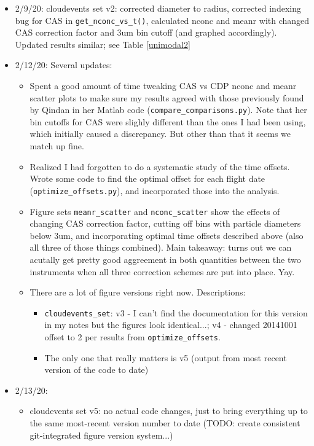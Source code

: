 \documentclass{article}
\begin{document}
\begin{itemize}
\begin{itemize}
		\end{itemize}
	\item 2/9/20: cloudevents set v2: corrected diameter to radius, corrected indexing bug for CAS in \texttt{get\_nconc\_vs\_t()}, calculated nconc and meanr with changed CAS correction factor and 3um bin cutoff (and graphed accordingly). Updated results similar; see Table \ref{unimodal2}\\
	\item 2/12/20: Several updates:
	\begin{itemize}
		\item Spent a good amount of time tweaking CAS vs CDP nconc and meanr scatter plots to make sure my results agreed with those previously found by Qindan in her Matlab code (\texttt{compare\_comparisons.py}). Note that her bin cutoffs for CAS were slighly different than the ones I had been using, which initially caused a discrepancy. But other than that it seems we match up fine.
		\item Realized I had forgotten to do a systematic study of the time offsets. Wrote some code to find the optimal offset for each flight date (\texttt{optimize\_offsets.py}), and incorporated those into the analysis. 
		\item Figure sets \texttt{meanr\_scatter} and \texttt{nconc\_scatter} show the effects of changing CAS correction factor, cutting off bins with particle diameters below 3um, and incorporating optimal time offsets described above (also all three of those things combined). Main takeaway: turns out we can acutally get pretty good aggreement in both quantities between the two instruments when all three correction schemes are put into place. Yay.
		\item There are a lot of figure versions right now. Descriptions: 
		\begin{itemize}
			\item \texttt{cloudevents\_set}: v3 - I can't find the documentation for this version in my notes but the figures look identical...; v4 - changed 20141001 offset to 2 per results from \texttt{optimize\_offsets}.
			\item The only one that really matters is v5 (output from most recent version of the code to date)
		\end{itemize}
	\end{itemize}
	\item 2/13/20:
	\begin{itemize}
		\item cloudevents set v5: no actual code changes, just to bring everything up to the same most-recent version number to date (TODO: create consistent git-integrated figure version system...)

\end{itemize}
\end{itemize}
\end{document}
